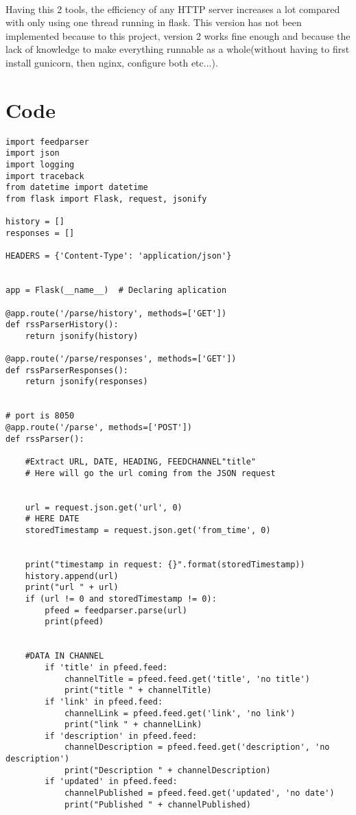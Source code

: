 \paragraph{}
Having this 2 tools, the efficiency of any HTTP server increases a lot compared with only using one thread running in flask. This version has not been implemented because to this project, version 2 works fine enough and because the lack of knowledge to make everything runnable as a whole(without having to first install gunicorn, then nginx, configure both etc...).

\section{Code}
\begin{lstlisting}[style=jorge-python]
import feedparser
import json
import logging
import traceback
from datetime import datetime
from flask import Flask, request, jsonify

history = []
responses = []

HEADERS = {'Content-Type': 'application/json'}


app = Flask(__name__)  # Declaring aplication

@app.route('/parse/history', methods=['GET'])
def rssParserHistory():
    return jsonify(history)

@app.route('/parse/responses', methods=['GET'])
def rssParserResponses():
    return jsonify(responses)


# port is 8050
@app.route('/parse', methods=['POST'])
def rssParser():

    #Extract URL, DATE, HEADING, FEEDCHANNEL"title"
    # Here will go the url coming from the JSON request


    url = request.json.get('url', 0)
    # HERE DATE
    storedTimestamp = request.json.get('from_time', 0)


    print("timestamp in request: {}".format(storedTimestamp))
    history.append(url)
    print("url " + url)
    if (url != 0 and storedTimestamp != 0):
        pfeed = feedparser.parse(url)
        print(pfeed)


    #DATA IN CHANNEL
        if 'title' in pfeed.feed:
            channelTitle = pfeed.feed.get('title', 'no title')
            print("title " + channelTitle)
        if 'link' in pfeed.feed:
            channelLink = pfeed.feed.get('link', 'no link')
            print("link " + channelLink)
        if 'description' in pfeed.feed:
            channelDescription = pfeed.feed.get('description', 'no description')
            print("Description " + channelDescription)
        if 'updated' in pfeed.feed:
            channelPublished = pfeed.feed.get('updated', 'no date')
            print("Published " + channelPublished)


\end{lstlisting}

